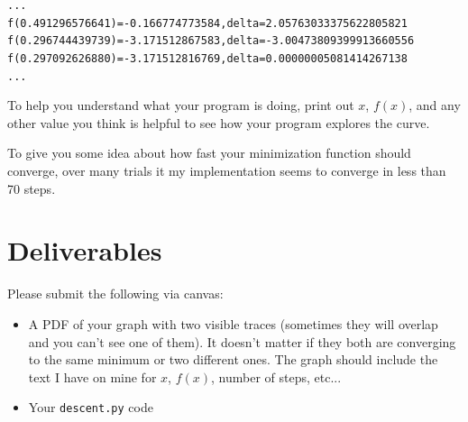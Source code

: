 \begin{fullwidth}
\begin{alltt}
...
f(0.491296576641) = -0.166774773584 , delta = 2.05763033375622805821
f(0.296744439739) = -3.171512867583 , delta = -3.00473809399913660556
f(0.297092626880) = -3.171512816769 , delta = 0.00000005081414267138
...
\end{alltt}

To help you understand what your program is doing, print out $x$, $f(x)$, and any other value you think is helpful to see how your program explores the curve.

To give you some idea about  how fast your minimization function should converge, over many trials it my implementation seems to converge in less than 70 steps.
 
\section{Deliverables}

Please submit the following via canvas:
 
\begin{itemize}
\item A PDF of your graph with two visible traces (sometimes they will overlap and you can't see one of them).  It doesn't matter if they both are converging to the same minimum or two different ones. The graph should include the text I have on mine for $x$, $f(x)$, number of steps, etc...
\item Your {\tt descent.py} code
\end{itemize}

\end{fullwidth}

